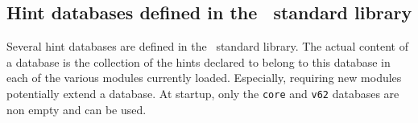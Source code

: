 




\subsection{Hint databases defined in the \Coq\ standard library}

Several hint databases are defined in the \Coq\ standard library.  The
actual content of a database is the collection of the hints declared
to belong to this database in each of the various modules currently
loaded.  Especially, requiring new modules potentially extend a
database. At {\Coq} startup, only the {\tt core} and {\tt v62}
databases are non empty and can be used.

